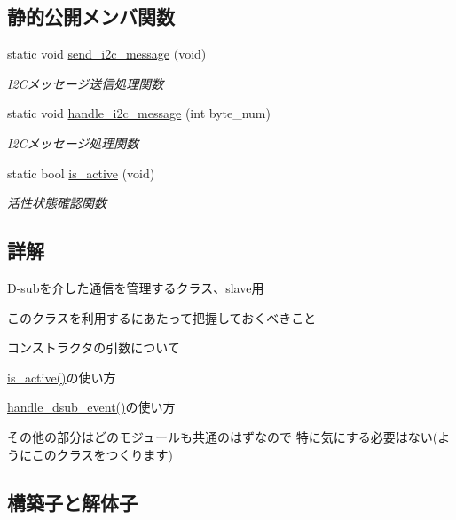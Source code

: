 \subsection*{静的公開メンバ関数}
\begin{DoxyCompactItemize}
\item 
static void \mbox{\hyperlink{class_dsub_slave_communicator_a0a49728ad2bec47e0cb6e6ee93f0182b}{send\+\_\+i2c\+\_\+message}} (void)
\begin{DoxyCompactList}\small\item\em I2\+Cメッセージ送信処理関数 \end{DoxyCompactList}\item 
static void \mbox{\hyperlink{class_dsub_slave_communicator_ad2b7d6a48942a55bea5f095da31eb683}{handle\+\_\+i2c\+\_\+message}} (int byte\+\_\+num)
\begin{DoxyCompactList}\small\item\em I2\+Cメッセージ処理関数 \end{DoxyCompactList}\item 
static bool \mbox{\hyperlink{class_dsub_slave_communicator_a7a7d6e43b95833e698761442b0741e72}{is\+\_\+active}} (void)
\begin{DoxyCompactList}\small\item\em 活性状態確認関数 \end{DoxyCompactList}\end{DoxyCompactItemize}


\subsection{詳解}
D-\/subを介した通信を管理するクラス、slave用 

このクラスを利用するにあたって把握しておくべきこと
\begin{DoxyItemize}
\item コンストラクタの引数について
\item \mbox{\hyperlink{class_dsub_slave_communicator_a7a7d6e43b95833e698761442b0741e72}{is\+\_\+active()}}の使い方
\item \mbox{\hyperlink{class_dsub_slave_communicator_aef578741915e2e109b7b4d7813693cfe}{handle\+\_\+dsub\+\_\+event()}}の使い方
\end{DoxyItemize}

その他の部分はどのモジュールも共通のはずなので 特に気にする必要はない(ようにこのクラスをつくります) 

\subsection{構築子と解体子}
\mbox{\label{class_dsub_slave_communicator_ad9cb5bf6b10c80a5f03b2e34e2bf4f9f}} 
